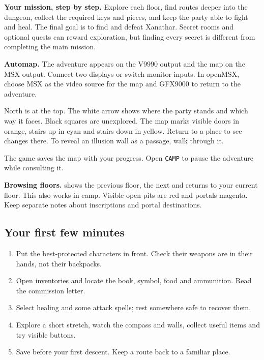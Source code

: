 \textbf{Your mission, step by step.} Explore each floor, find routes deeper into the dungeon, collect the required keys and pieces, and keep the party able to fight and heal. The final goal is to find and defeat Xanathar. Secret rooms and optional quests can reward exploration, but finding every secret is different from completing the main mission.

\textbf{Automap.} The adventure appears on the V9990 output and the map on the MSX output. Connect two displays or switch monitor inputs. In openMSX, choose MSX as the video source for the map and GFX9000 to return to the adventure.

North is at the top. The white arrow shows where the party stands and which way it faces. Black squares are unexplored. The map marks visible doors in orange, stairs up in cyan and stairs down in yellow. Return to a place to see changes there. To reveal an illusion wall as a passage, walk through it.

The game saves the map with your progress. Open \texttt{CAMP} to pause the adventure while consulting it.

\textbf{Browsing floors.}  shows the previous floor,  the next and  returns to your current floor. This also works in camp. Visible open pits are red and portals magenta. Keep separate notes about inscriptions and portal destinations.

\subsection*{Your first few minutes}
\begin{enumerate}
\item Put the best-protected characters in front. Check their weapons are in their hands, not their backpacks.
\item Open inventories and locate the book, symbol, food and ammunition. Read the commission letter.
\item Select healing and some attack spells; rest somewhere safe to recover them.
\item Explore a short stretch, watch the compass and walls, collect useful items and try visible buttons.
\item Save before your first descent. Keep a route back to a familiar place.
\end{enumerate}

